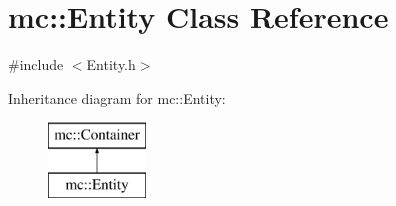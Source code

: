 \hypertarget{classmc_1_1_entity}{}\section{mc\+:\+:Entity Class Reference}
\label{classmc_1_1_entity}


{\ttfamily \#include $<$Entity.\+h$>$}

Inheritance diagram for mc\+:\+:Entity\+:\begin{figure}[H]
\begin{center}
\leavevmode
\includegraphics[height=2.000000cm]{d3/d0b/classmc_1_1_entity}
\end{center}
\end{figure}
